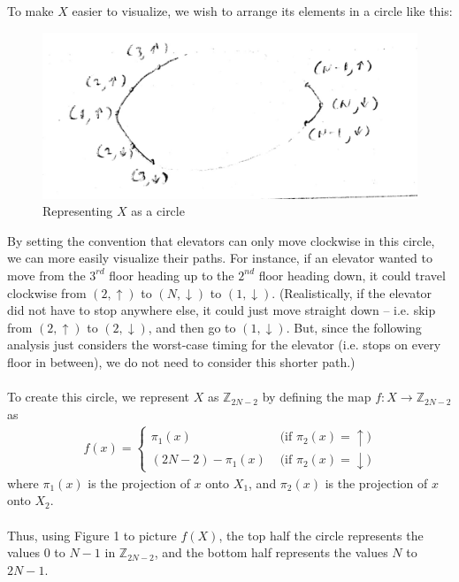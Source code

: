 \documentclass[letterpaper]{article} %
\begin{document}
To make $X$ easier to visualize, we wish to arrange its elements in a circle like this:\\
\begin{figure}
  \centering
    \includegraphics[scale=0.2]{circle}
  \caption{Representing $X$ as a circle}
\end{figure}
By setting the convention that elevators can only move clockwise in this circle, we can more easily visualize their paths. For instance, if an elevator wanted to move from the $3^{rd}$ floor heading up to the $2^{nd}$ floor heading down, it could travel clockwise from $(2, \uparrow)$ to $(N, \downarrow)$ to $(1, \downarrow)$. (Realistically, if the elevator did not have to stop anywhere else, it could just move straight down -- i.e. skip from $(2, \uparrow)$ to $(2, \downarrow)$, and then go to $(1, \downarrow)$. But, since the following analysis just considers the worst-case timing for the elevator (i.e. stops on every floor in between), we do not need to consider this shorter path.)\\\\
To create this circle, we represent $X$ as $\mathbb{Z}_{2N - 2}$ by defining the map $f: X \rightarrow \mathbb{Z}_{2N - 2}$ as \\
\begin{align*}
    f(x)=\left\{
                \begin{array}{ll}
                  \pi_{1}(x) &\text{ (if $\pi_2(x) = \uparrow$)}\\
                  (2N - 2) - \pi_{1}(x) &\text{ (if $\pi_2(x) = \downarrow$)}
                \end{array}
              \right.
\end{align*}
where $\pi_{1}(x)$ is the projection of $x$ onto $X_1$, and $\pi_{2}(x)$ is the projection of $x$ onto $X_2$. \\\\
Thus, using Figure 1 to picture $f(X)$, the top half the circle represents the values $0$ to $N - 1$ in $\mathbb{Z}_{2N - 2}$, and the bottom half represents the values $N$ to $2N - 1$.
\end{document}
